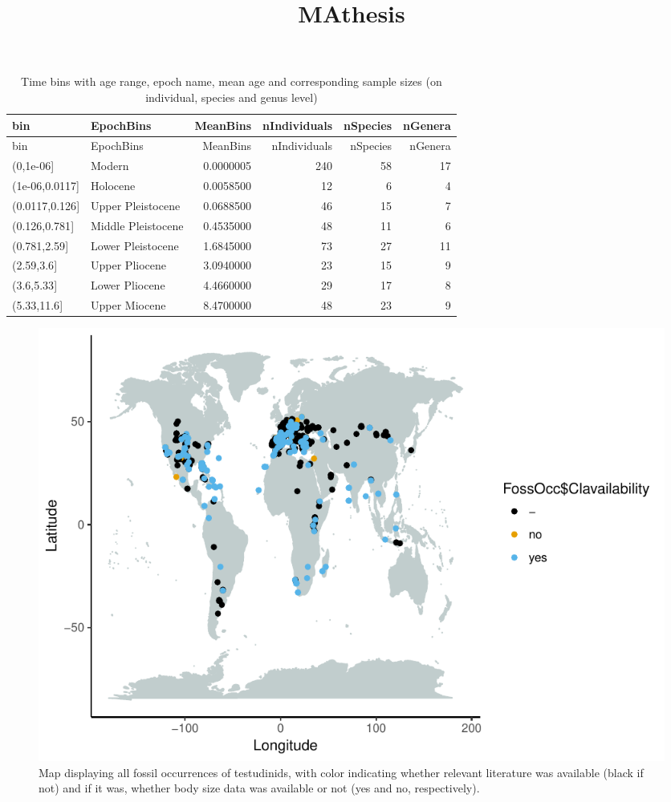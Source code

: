 \documentclass[]{article}
\title{MAthesis}
\author{}
\date{}
\begin{document}
\maketitle

\begin{longtable}[]{@{}llrrrr@{}}
\caption{Time bins with age range, epoch name, mean age and
corresponding sample sizes (on individual, species and genus
level)}\tabularnewline
\toprule
bin & EpochBins & MeanBins & nIndividuals & nSpecies &
nGenera\tabularnewline
\midrule
\endfirsthead
\toprule
bin & EpochBins & MeanBins & nIndividuals & nSpecies &
nGenera\tabularnewline
\midrule
\endhead
(0,1e-06{]} & Modern & 0.0000005 & 240 & 58 & 17\tabularnewline
(1e-06,0.0117{]} & Holocene & 0.0058500 & 12 & 6 & 4\tabularnewline
(0.0117,0.126{]} & Upper Pleistocene & 0.0688500 & 46 & 15 &
7\tabularnewline
(0.126,0.781{]} & Middle Pleistocene & 0.4535000 & 48 & 11 &
6\tabularnewline
(0.781,2.59{]} & Lower Pleistocene & 1.6845000 & 73 & 27 &
11\tabularnewline
(2.59,3.6{]} & Upper Pliocene & 3.0940000 & 23 & 15 & 9\tabularnewline
(3.6,5.33{]} & Lower Pliocene & 4.4660000 & 29 & 17 & 8\tabularnewline
(5.33,11.6{]} & Upper Miocene & 8.4700000 & 48 & 23 & 9\tabularnewline
\bottomrule
\end{longtable}

\begin{figure}[htbp]
\centering
\includegraphics{MA_JJ_files/figure-latex/Map fossil occurrences-1.pdf}
\caption{Map displaying all fossil occurrences of testudinids, with
color indicating whether relevant literature was available (black if
not) and if it was, whether body size data was available or not (yes and
no, respectively).}
\end{figure}
\end{document}
